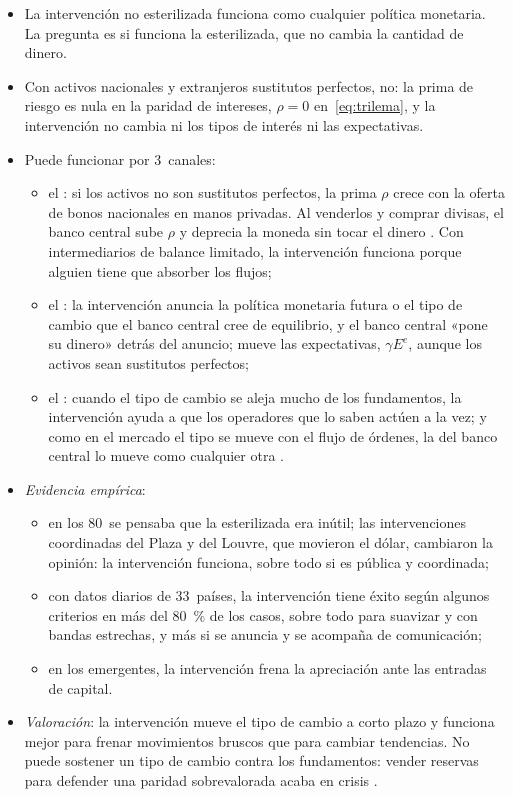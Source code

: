 \documentclass[11pt]{article}
\begin{document}
\begin{itemize}
\item La intervención no esterilizada funciona como cualquier política monetaria. La pregunta es si funciona la esterilizada, que no cambia la cantidad de dinero.
\item Con activos nacionales y extranjeros sustitutos perfectos, no: la prima de riesgo es nula en la paridad de intereses, $\rho=0$ en~\eqref{eq:trilema}, y la intervención no cambia ni los tipos de interés ni las expectativas.
\item Puede funcionar por 3~canales:
  \begin{itemize}
  \item el : si los activos no son sustitutos perfectos, la prima $\rho$ crece con la oferta de bonos nacionales en manos privadas. Al venderlos y comprar divisas, el banco central sube $\rho$ y deprecia la moneda sin tocar el dinero\nocite{Branson1977Asset} . Con intermediarios de balance limitado, la intervención funciona porque alguien tiene que absorber los flujos\nocite{GabaixMaggiori2015};
  \item el : la intervención anuncia la política monetaria futura o el tipo de cambio que el banco central cree de equilibrio, y el banco central «pone su dinero» detrás del anuncio; mueve las expectativas, $\gamma E^e$, aunque los activos sean sustitutos perfectos\nocite{Mussa1981Role};
  \item el : cuando el tipo de cambio se aleja mucho de los fundamentos, la intervención ayuda a que los operadores que lo saben actúen a la vez\nocite{SarnoTaylor2001Official}; y como en el mercado el tipo se mueve con el flujo de órdenes, la del banco central lo mueve como cualquier otra\nocite{EvansLyons2002} .
  \end{itemize}
\item \emph{Evidencia empírica}:
  \begin{itemize}
  \item en los 80~se pensaba que la esterilizada era inútil; las intervenciones coordinadas del Plaza y del Louvre, que movieron el dólar, cambiaron la opinión: la intervención funciona, sobre todo si es pública y coordinada\nocite{DominguezFrankel1993Does};
  \item con datos diarios de 33~países, la intervención tiene éxito según algunos criterios en más del 80~\% de los casos, sobre todo para suavizar y con bandas estrechas, y más si se anuncia y se acompaña de comunicación\nocite{FratzscherEtAl2019When};
  \item en los emergentes, la intervención frena la apreciación ante las entradas de capital\nocite{BlanchardAdlerCarvalho2015Can}.
  \end{itemize}
\item \emph{Valoración}: la intervención mueve el tipo de cambio a corto plazo y funciona mejor para frenar movimientos bruscos que para cambiar tendencias. No puede sostener un tipo de cambio contra los fundamentos: vender reservas para defender una paridad sobrevalorada acaba en crisis .
\end{itemize}
\end{document}
